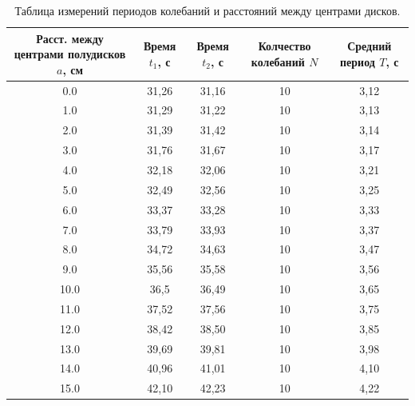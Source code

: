 \documentclass[a4paper]{article}
\begin{document}
    \begin{table}[h!]
    \begin{center}
    \begin{tabular}{|c|c|c|c|c|}
    \hline

    Расст. между центрами полудисков $a$, см   & Время $t_1$, с  & Время $t_2$, с  & Колчество колебаний $N$ & Средний период $T$, с     \\\hline

    0.0     & 31,26      & 31,16    & 10   & 3,12          \\ \hline
    1.0     & 31,29      & 31,22    & 10   & 3,13          \\ \hline
    2.0     & 31,39      & 31,42    & 10   & 3,14          \\ \hline
    3.0     & 31,76      & 31,67    & 10   & 3,17          \\ \hline
    4.0     & 32,18      & 32,06    & 10   & 3,21          \\ \hline
    5.0     & 32,49      & 32,56    & 10   & 3,25          \\ \hline
    6.0     & 33,37      & 33,28    & 10   & 3,33          \\ \hline
    7.0     & 33,79      & 33,93    & 10   & 3,37          \\ \hline
    8.0     & 34,72      & 34,63    & 10   & 3,47          \\ \hline
    9.0     & 35,56      & 35,58    & 10   & 3,56          \\ \hline
    10.0     & 36,5      & 36,49    & 10   & 3,65          \\ \hline
    11.0     & 37,52      & 37,56    & 10   & 3,75          \\ \hline
    12.0     & 38,42      & 38,50    & 10   & 3,85          \\ \hline
    13.0     & 39,69      & 39,81    & 10   & 3,98          \\ \hline
    14.0     & 40,96      & 41,01    & 10   & 4,10          \\ \hline
    15.0     & 42,10      & 42,23    & 10   & 4,22          \\ \hline


    \end{tabular}
    \caption{Таблица измерений периодов колебаний и расстояний между центрами дисков.}
    \end{center}
    \end{table}

    \newpage
\end{document}
